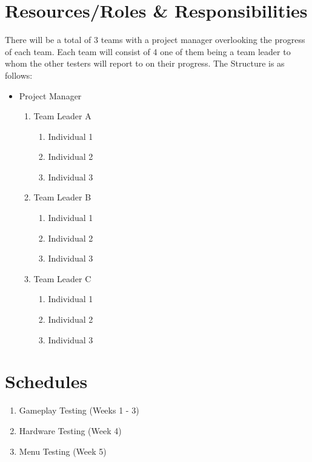 \documentclass[a4paper, 10pt]{article}
\begin{document}
\section{Resources/Roles \& Responsibilities}
There will be a total of 3 teams with a project manager overlooking the progress of each team. Each team will consist of 4 one of them being a team leader to whom the other testers will report to on their progress. The Structure is as follows:
    \begin{itemize}
        \item Project Manager
            \begin{enumerate}
                \item Team Leader A
                    \begin{enumerate}
                        \item Individual 1
                        \item Individual 2
                        \item Individual 3
                    \end{enumerate}
                \item Team Leader B
                    \begin{enumerate}
                        \item Individual 1
                        \item Individual 2
                        \item Individual 3
                    \end{enumerate}
                \item Team Leader C
                    \begin{enumerate}
                        \item Individual 1
                        \item Individual 2
                        \item Individual 3
                    \end{enumerate}
            \end{enumerate}
    \end{itemize}

\section{Schedules}
\begin{enumerate}
    \item Gameplay Testing (Weeks 1 - 3)
    \item Hardware Testing (Week 4)
    \item Menu Testing (Week 5)
\end{enumerate}
\end{document}
